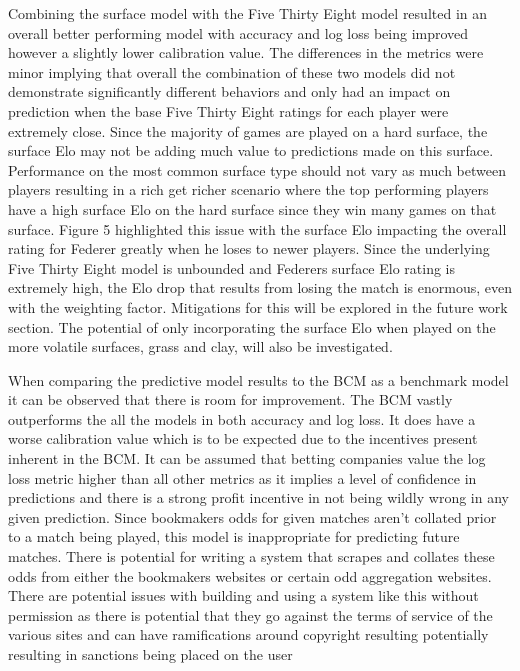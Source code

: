 \documentclass[12pt,a4paper]{article}
\begin{document}
Combining the surface model with the Five Thirty Eight model resulted in an overall better performing
model with accuracy and log loss being improved however a slightly lower calibration value.
The differences in the metrics were minor implying that overall the combination of these two models
did not demonstrate significantly different behaviors and only had an impact on prediction when the
base Five Thirty Eight ratings for each player were extremely close. Since the majority of games
are played on a hard surface, the surface Elo may not be adding much value to predictions made on
this surface. Performance on the most common surface type should not vary as much between players
resulting in a rich get richer scenario where the top performing players have a high surface Elo
on the hard surface since they win many games on that surface. Figure 5 highlighted this issue with
the surface Elo impacting the overall rating for Federer greatly when he loses to newer players.
Since the underlying Five Thirty Eight model is unbounded and Federers surface Elo rating is
extremely high, the Elo drop that results from losing the match is enormous, even with the weighting
factor. Mitigations for this will be explored in the future work section. The
potential of only incorporating the surface Elo when played on the more volatile surfaces, grass
and clay, will also be investigated.

When comparing the predictive model results to the BCM as a benchmark model
it can be observed that there is room for improvement. The BCM vastly
outperforms the all the models in both accuracy and log loss. It does have a worse calibration
value which is to be expected due to the incentives present inherent in the BCM. It can be assumed
that betting companies value the log loss metric higher than all other metrics as it implies a level
of confidence in predictions and there is a strong profit incentive in not being wildly wrong
in any given prediction. Since bookmakers odds for given matches aren't collated prior to a match
being played, this model is inappropriate for predicting future matches. There is potential for
writing a system that scrapes and collates these odds from either the bookmakers websites or
certain odd aggregation websites. There are potential issues with building and using a system like
this without permission as there is potential that they go against the terms of service of the
various sites and can have ramifications around copyright resulting potentially resulting in
sanctions being placed on the user \cite{out-lawcom_ryanair_nodate}
\end{document}
